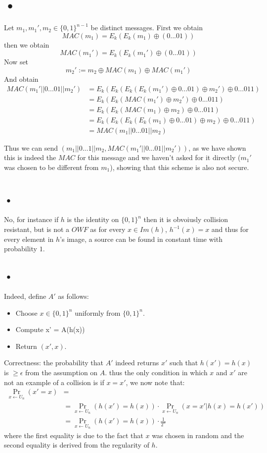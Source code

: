 \documentclass{article}
\begin{document}
\section{•}
Let $m_1,m_1', m_2\in \{0,1\}^{n-1}$ be distinct messages. First we obtain 
\[MAC(m_1) = E_k(E_k(m_1) \oplus(0...01))\]
 then we obtain 
\[MAC(m_1') = E_k(E_k(m_1') \oplus(0...01))\]
Now set 
\[m_2' := m_2 \oplus  MAC(m_1)  \oplus  MAC(m_1')\]
And obtain 
\begin{align*}
MAC(m_1'|| 0...01|| m_2') &= E_k( E_k( E_k(E_k(m_1')\oplus 0...01 ) \oplus m_2')\oplus 0...011)\\
 &= E_k( E_k( MAC(m_1') \oplus m_2')\oplus 0...011)\\
 &= E_k( E_k( MAC(m_1) \oplus m_2)\oplus 0...011)\\
 &= E_k( E_k( E_k(E_k(m_1)\oplus 0...01 ) \oplus m_2)\oplus 0...011)\\
 &= MAC(m_1||0...01||m_2)
\end{align*}

Thus we can send $(m_1||0...1|| m_2 , MAC(m_1'|| 0...01|| m_2'))$, as we have shown this is indeed the $MAC$ for this message and we haven't asked for it directly ($m_1'$ was  chosen to be different from $m_1$), showing that this scheme is also not secure.

\section{}
\subsection{•}
No, for instance if $h$ is the identity on $\{0,1\}^n$ then it is obvoiusly collision resistant, but is not a $OWF$ as for every $x \in Im(h)$, $h^{-1}(x) = x$ and thus for every element in $h$'s image, a source can be found in constant time with probability $1$. 

\subsection{•}
Indeed, define $A'$ as follows:
\begin{itemize}
\item Choose $x \in \{0,1\}^n$ uniformly from $\{0,1\}^n$.
\item Compute x' = A(h(x))
\item Return $(x', x)$.
\end{itemize}
Correctness: the probability that $A'$ indeed returns $x'$ such that $h(x') = h(x)$ is $\geq \epsilon$ from the assumption on $A$. thus the only condition in which $x$ and $x'$ are not an example of a collision is if $x = x'$,  we now note that:
\begin{align*}
\Pr_{x \leftarrow U_n}(x'=x) &=\\
&=\Pr_{x \leftarrow U_n}(h(x')=h(x)) \cdot \Pr_{x \leftarrow U_n}(x = x' | h(x) = h(x')) \\
&= \Pr_{x \leftarrow U_n}(h(x')=h(x)) \cdot \frac{1}{2^n}
\end{align*}
where the first equality is due to the fact that $x$ was chosen in random and the second equality is derived from the regularity of $h$. 
\end{document}
